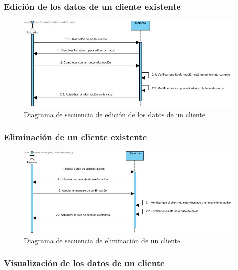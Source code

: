 \subsubsection{Edición de los datos de un cliente existente}

\begin{figure}[H]
	\centering
	\includegraphics[width=1\textwidth]{imagenes/imagenesDiagramas/Cliente/editarCliente.jpg}
	\caption{Diagrama de secuencia de edición de los datos de un cliente}
	\label{fig:seqdiag13}
\end{figure}

\subsubsection{Eliminación de un cliente existente}

\begin{figure}[H]
	\centering
	\includegraphics[width=1\textwidth]{imagenes/imagenesDiagramas/Cliente/eliminarCliente.jpg}
	\caption{Diagrama de secuencia de eliminación de un cliente}
	\label{fig:seqdiag14}
\end{figure}

\subsubsection{Visualización de los datos de un cliente}

